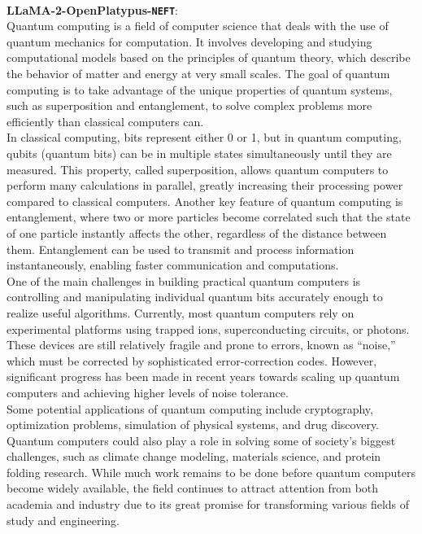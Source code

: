 \documentclass{article} %
\newcommand{\neft}{\texttt{NEFT}}
\newcommand{\llama}{LLaMA}
\begin{document}
\begin{tcolorbox}[breakable,boxrule=0pt]
  \\\textbf{\llama{}-2-OpenPlatypus-\neft{}}: \\Quantum computing is a field of computer science that deals with the use of quantum mechanics for computation. It involves developing and studying computational models based on the principles of quantum theory, which describe the behavior of matter and energy at very small scales. The goal of quantum computing is to take advantage of the unique properties of quantum systems, such as superposition and entanglement, to solve complex problems more efficiently than classical computers can.\\In classical computing, bits represent either 0 or 1, but in quantum computing, qubits (quantum bits) can be in multiple states simultaneously until they are measured. This property, called superposition, allows quantum computers to perform many calculations in parallel, greatly increasing their processing power compared to classical computers. Another key feature of quantum computing is entanglement, where two or more particles become correlated such that the state of one particle instantly affects the other, regardless of the distance between them. Entanglement can be used to transmit and process information instantaneously, enabling faster communication and computations.\\One of the main challenges in building practical quantum computers is controlling and manipulating individual quantum bits accurately enough to realize useful algorithms. Currently, most quantum computers rely on experimental platforms using trapped ions, superconducting circuits, or photons. These devices are still relatively fragile and prone to errors, known as ``noise,'' which must be corrected by sophisticated error-correction codes. However, significant progress has been made in recent years towards scaling up quantum computers and achieving higher levels of noise tolerance.\\Some potential applications of quantum computing include cryptography, optimization problems, simulation of physical systems, and drug discovery. Quantum computers could also play a role in solving some of society's biggest challenges, such as climate change modeling, materials science, and protein folding research. While much work remains to be done before quantum computers become widely available, the field continues to attract attention from both academia and industry due to its great promise for transforming various fields of study and engineering.
  
\end{tcolorbox}
\end{document}
